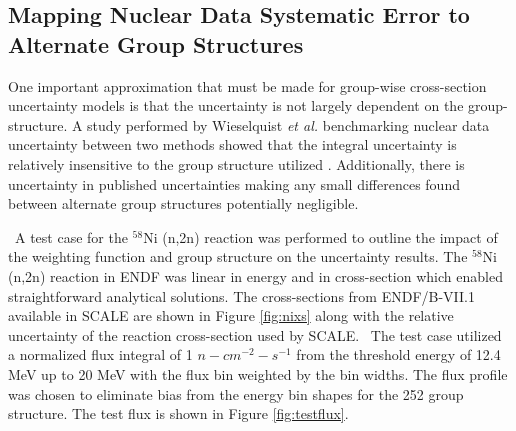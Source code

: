 
\subsection{Mapping Nuclear Data Systematic Error to Alternate Group Structures}\label{Mapping}

One important approximation that must be made for group-wise cross-section uncertainty models is that the uncertainty is not largely dependent on the group-structure. 
A study performed by Wieselquist \textit{et al.} benchmarking nuclear data uncertainty between two methods showed that the integral uncertainty is relatively insensitive to the group structure utilized \cite{Wieselquist2013}. 
Additionally, there is uncertainty in published uncertainties making any small differences found between alternate group structures potentially negligible.  

\ A test case for the $\mathrm{^{58}}$Ni (n,2n) reaction was performed to outline the impact of the weighting function and group structure on the uncertainty results. 
The $\mathrm{^{58}}$Ni (n,2n) reaction in ENDF was linear in energy and in cross-section which enabled straightforward analytical solutions. 
The cross-sections from ENDF/B-VII.1 available in SCALE are shown in Figure \ref{fig:nixs} along with the relative uncertainty of the reaction cross-section used by SCALE. 
\ The test case utilized a normalized flux integral of 1 $n-cm^{-2}-s^{-1}$ from the threshold energy of 12.4 MeV up to 20 MeV with the flux bin weighted by the bin widths. 
The flux profile was chosen to eliminate bias from the energy bin shapes for the 252 group structure. 
The test flux is shown in Figure \ref{fig:testflux}.


